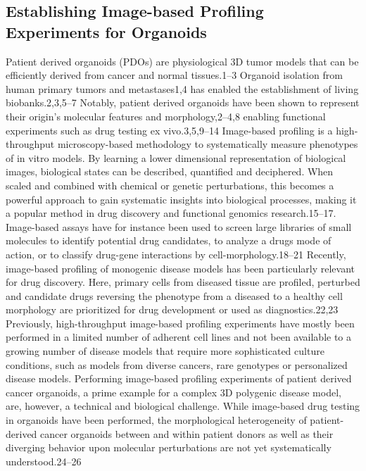 \begin{flushleft}
\subsection{Establishing Image-based Profiling Experiments for Organoids}

Patient derived organoids (PDOs) are physiological 3D tumor models that can be efficiently derived from cancer and normal tissues.1–3 Organoid isolation from human primary tumors and metastases1,4 has enabled the establishment of living biobanks.2,3,5–7 Notably, patient derived organoids have been shown to represent their origin’s molecular features and morphology,2–4,8 enabling functional experiments such as drug testing ex vivo.3,5,9–14 
Image-based profiling is a high-throughput microscopy-based methodology to systematically measure phenotypes of in vitro models. By learning a lower dimensional representation of biological images, biological states can be described, quantified and deciphered. When scaled and combined with chemical or genetic perturbations, this becomes a powerful approach to gain systematic insights into biological processes, making it a popular method in drug discovery and functional genomics research.15–17. Image-based assays have for instance been used to screen large libraries of small molecules to identify potential drug candidates, to analyze a drugs mode of action, or to classify drug-gene interactions by cell-morphology.18–21 Recently, image-based profiling of monogenic disease models has been particularly relevant for drug discovery. Here, primary cells from diseased tissue are profiled, perturbed and candidate drugs reversing the phenotype from a diseased to a healthy cell morphology are prioritized for drug development or used as diagnostics.22,23
Previously, high-throughput image-based profiling experiments have mostly been performed in a limited number of adherent cell lines and not been available to a growing number of disease models that require more sophisticated culture conditions, such as models from diverse cancers, rare genotypes or personalized disease models. Performing image-based profiling experiments of patient derived cancer organoids, a prime example for a complex 3D polygenic disease model, are, however, a technical and biological challenge. While image-based drug testing in organoids have been performed, the morphological heterogeneity of patient-derived cancer organoids between and within patient donors as well as their diverging behavior upon molecular perturbations are not yet systematically understood.24–26

\end{flushleft}
